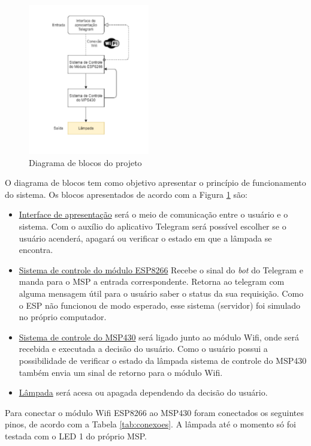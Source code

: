 \documentclass[12pt,journal,compsoc]{IEEEtran}
\begin{document}
\begin{figure}[h!]
\centering
\includegraphics[width=200px,height=\textheight,keepaspectratio]{diagrama_blocos}
\caption{Diagrama de blocos do projeto}
\label{fig:diagrama_blocos}
\end{figure}

O diagrama de blocos tem como objetivo apresentar o princípio de funcionamento do sistema. Os blocos apresentados de acordo com a Figura \ref{fig:diagrama_blocos} são:


\begin{itemize}
\item \underline{Interface de apresentação} será o meio de comunicação entre o usuário e o sistema. Com o auxílio do aplicativo Telegram será possível escolher se o usuário acenderá, apagará ou verificar o estado em que a lâmpada se encontra.
\item \underline{Sistema de controle do módulo ESP8266} Recebe o sinal do \textit{bot} do Telegram e manda para o MSP a entrada correspondente. Retorna ao telegram com alguma mensagem útil para o usuário saber o status da sua requisição. Como o ESP não funcionou de modo esperado, esse sistema (servidor) foi simulado no próprio computador.
\item \underline{Sistema de controle do MSP430} será ligado junto ao módulo Wifi, onde será recebida e executada a decisão do usuário. Como o usuário possui a possibilidade de verificar o estado da lâmpada sistema de controle do MSP430 também envia um sinal de retorno para o módulo Wifi.
\item \underline{Lâmpada} será acesa ou apagada dependendo da decisão do usuário.
\end{itemize}

Para conectar o módulo Wifi ESP8266 ao MSP430 foram conectados os seguintes pinos, de acordo com a Tabela \ref{tab:conexoes}. A lâmpada até o momento só foi testada com o LED 1 do próprio MSP.
\end{document}
